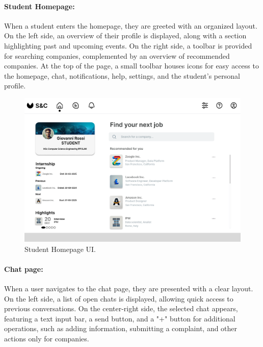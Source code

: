\newpage

\paragraph{Student Homepage:} When a student enters the homepage, they are greeted with an organized layout. On the left side, an overview of their profile is displayed, along with a section highlighting past and upcoming events. On the right side, a toolbar is provided for searching companies, complemented by an overview of recommended companies. At the top of the page, a small toolbar houses icons for easy access to the homepage, chat, notifications, help, settings, and the student’s personal profile.

\begin{figure}[H]
    \begin{center}
        \includegraphics[width=\linewidth]{Images/UserInterfaces/SHomepage.pdf}
        \caption{Student Homepage UI.}        
        \label{fig:student_homepage_UI}%
    \end{center}
\end{figure}

\newpage

\paragraph{Chat page:} When a user navigates to the chat page, they are presented with a clear layout. On the left side, a list of open chats is displayed, allowing quick access to previous conversations. On the center-right side, the selected chat appears, featuring a text input bar, a send button, and a "+" button for additional operations, such as adding information, submitting a complaint, and other actions only for companies.

